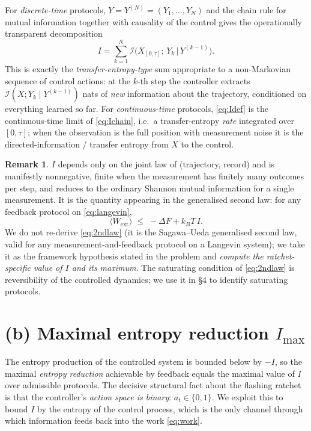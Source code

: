 \documentclass{amsart}
\theoremstyle{definition}
\newtheorem{remark}{Remark}
\newcommand{\kB}{k_{B}}
\newcommand{\Wext}{\langle W_{\mathrm{ext}}\rangle}
\begin{document}
For \emph{discrete-time} protocols, $Y=Y^{(N)}=(Y_1,\dots,Y_N)$ and the chain
rule for mutual information together with causality of the control gives the
operationally transparent decomposition
\begin{equation}\label{eq:Ichain}
I=\sum_{k=1}^{N}\mathcal I\!\bigl(X_{[0,\tau]};\,Y_k \,\big|\, Y^{(k-1)}\bigr).
\end{equation}
This is exactly the \emph{transfer-entropy-type} sum appropriate to a
non-Markovian sequence of control actions: at the $k$-th step the controller
extracts $\mathcal I(X;Y_k\mid Y^{(k-1)})$ nats of \emph{new} information about
the trajectory, conditioned on everything learned so far. For
\emph{continuous-time} protocols, \eqref{eq:Idef} is the continuous-time
limit of \eqref{eq:Ichain}, i.e.\ a transfer-entropy \emph{rate} integrated
over $[0,\tau]$; when the observation is the full position with measurement
noise it is the directed-information / transfer entropy from $X$ to the
control.

\begin{remark}
$I$ depends only on the joint law of (trajectory, record) and is
manifestly nonnegative, finite when the measurement has finitely many
outcomes per step, and reduces to the ordinary Shannon mutual information for
a single measurement. It is the quantity appearing in the generalised second
law: for any feedback protocol on \eqref{eq:langevin},
\begin{equation}\label{eq:2ndlaw}
\Wext \;\le\; -\Delta F + \kB T\, I .
\end{equation}
We do not re-derive \eqref{eq:2ndlaw} (it is the Sagawa--Ueda generalised
second law, valid for any measurement-and-feedback protocol on a Langevin
system); we take it as the framework hypothesis stated in the problem and
\emph{compute the ratchet-specific value of $I$ and its maximum}. The
saturating condition of \eqref{eq:2ndlaw} is reversibility of the controlled
dynamics; we use it in \S4 to identify saturating protocols.
\end{remark}

\section{(b) Maximal entropy reduction $I_{\max}$}

The entropy production of the controlled system is bounded below by $-I$, so
the maximal \emph{entropy reduction} achievable by feedback equals the maximal
value of $I$ over admissible protocols. The decisive structural fact about the
flashing ratchet is that the controller's \emph{action space is binary}:
$a_t\in\{0,1\}$. We exploit this to bound $I$ by the entropy of the control
process, which is the only channel through which information feeds back into
the work \eqref{eq:work}.
\end{document}
